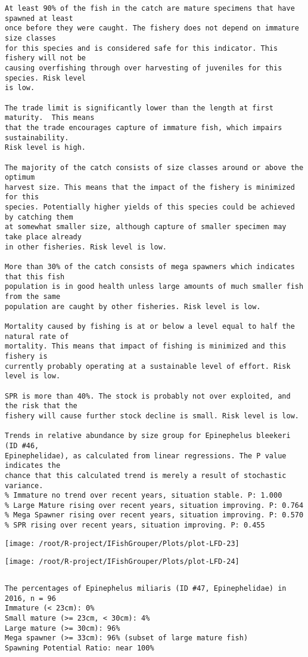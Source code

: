 \documentclass{report}\usepackage[]{graphicx}\usepackage[]{color}
\makeatletter
\def\maxwidth{ %
  \ifdim\Gin@nat@width>\linewidth
    \linewidth
  \else
    \Gin@nat@width
  \fi
}
\newenvironment{kframe}{%
 \def\at@end@of@kframe{}%
 \ifinner\ifhmode%
  \def\at@end@of@kframe{\end{minipage}}%
  \begin{minipage}{\columnwidth}%
 \fi\fi%
 \def\FrameCommand##1{\hskip\@totalleftmargin \hskip-\fboxsep
 \colorbox{shadecolor}{##1}\hskip-\fboxsep
     \hskip-\linewidth \hskip-\@totalleftmargin \hskip\columnwidth}%
 \MakeFramed {\advance\hsize-\width
   \@totalleftmargin\z@ \linewidth\hsize
   \@setminipage}}%
 {\par\unskip\endMakeFramed%
 \at@end@of@kframe}
\newenvironment{knitrout}{}{} %
\makeatother
\begin{document}
\begin{knitrout}
\begin{kframe}
\begin{verbatim}
At least 90% of the fish in the catch are mature specimens that have spawned at least
once before they were caught. The fishery does not depend on immature size classes
for this species and is considered safe for this indicator. This fishery will not be
causing overfishing through over harvesting of juveniles for this species. Risk level
is low.

The trade limit is significantly lower than the length at first maturity.  This means
that the trade encourages capture of immature fish, which impairs sustainability.
Risk level is high.

The majority of the catch consists of size classes around or above the optimum
harvest size. This means that the impact of the fishery is minimized for this
species. Potentially higher yields of this species could be achieved by catching them
at somewhat smaller size, although capture of smaller specimen may take place already
in other fisheries. Risk level is low.

More than 30% of the catch consists of mega spawners which indicates that this fish
population is in good health unless large amounts of much smaller fish from the same
population are caught by other fisheries. Risk level is low.
 
Mortality caused by fishing is at or below a level equal to half the natural rate of
mortality. This means that impact of fishing is minimized and this fishery is
currently probably operating at a sustainable level of effort. Risk level is low.
 
SPR is more than 40%. The stock is probably not over exploited, and the risk that the
fishery will cause further stock decline is small. Risk level is low.
 
Trends in relative abundance by size group for Epinephelus bleekeri (ID #46,
Epinephelidae), as calculated from linear regressions. The P value indicates the
chance that this calculated trend is merely a result of stochastic variance.
% Immature no trend over recent years, situation stable. P: 1.000
% Large Mature rising over recent years, situation improving. P: 0.764
% Mega Spawner rising over recent years, situation improving. P: 0.570
% SPR rising over recent years, situation improving. P: 0.455
\end{verbatim}
\end{kframe}
\texttt{[image: /root/R-project/IFishGrouper/Plots/plot-LFD-23]} 

\texttt{[image: /root/R-project/IFishGrouper/Plots/plot-LFD-24]} 
\begin{kframe}\begin{verbatim}
\end{verbatim}
\end{kframe}
\clearpage
\newpage
\begin{kframe}\begin{verbatim}The percentages of Epinephelus miliaris (ID #47, Epinephelidae) in 2016, n = 96
Immature (< 23cm): 0%
Small mature (>= 23cm, < 30cm): 4%
Large mature (>= 30cm): 96%
Mega spawner (>= 33cm): 96% (subset of large mature fish)
Spawning Potential Ratio: near 100%
 

\end{verbatim}
\end{kframe}
\end{knitrout}
\end{document}
